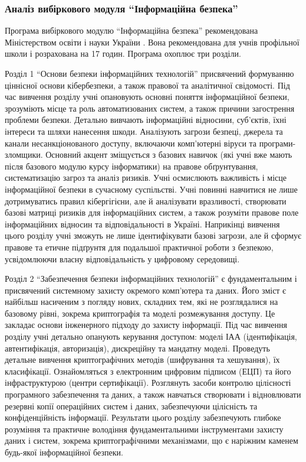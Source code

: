 \subsubsection{Аналіз вибіркового модуля ``Інформаційна безпека''} 
Програма вибіркового модулю ``Інформаційна безпека'' рекомендована Міністерством освіти і науки України \cite{inform_10_11_standart}. Вона рекомендована для учнів профільної школи і розрахована на 17 годин. Програма охоплює три розділи.

Розділ 1 ``Основи безпеки інформаційних технологій'' присвячений формуванню ціннісної основи кібербезпеки, а також правової та аналітичної свідомості. Під час вивчення розділу учні опановують основні поняття інформаційної безпеки, зрозуміють місце та роль автоматизованих систем, а також причини загострення проблеми безпеки. Детально вивчають інформаційні відносини, суб'єктів, їхні інтереси та шляхи нанесення шкоди. Аналізують загрози безпеці, джерела та канали несанкціонованого доступу, включаючи комп'ютерні віруси та програми-зломщики. Основний акцент зміщується з базових навичок (які учні вже мають після базового модулю курсу інформатики) на правове обґрунтування, систематизацію загроз та аналіз ризиків. Учні осмислюють важливість і місце інформаційної безпеки в сучасному суспільстві. Учні повинні навчитися не лише дотримуватись правил кібергігієни, але й аналізувати вразливості, створювати базові матриці ризиків для інформаційних систем, а також розуміти правове поле інформаційних відносин та відповідальності в Україні. 
Наприкінці вивчення цього розділу учні зможуть не лише ідентифікувати базові загрози, але й сформує правове та етичне підґрунтя для подальшої практичної роботи з безпекою, усвідомлюючи власну відповідальність у цифровому середовищі.

Розділ 2 ``Забезпечення безпеки інформаційних технологій'' є фундаментальним і присвячений системному захисту окремого комп'ютера та даних. Його зміст є найбільш насиченим з погляду нових, складних тем, які не розглядалися на базовому рівні, зокрема криптографія та моделі розмежування доступу. Це закладає основи інженерного підходу до захисту інформації. Під час вивчення розділу учні детально опанують керування доступом: моделі ІАА (ідентифікація, автентифікація, авторизація), дискреційну та мандатну моделі. Проведуть детальне вивчення криптографічних методів (шифрування та хешування), їх класифікації. Ознайомляться з електронним цифровим підписом (ЕЦП) та його інфраструктурою (центри сертифікації). Розглянуть засоби контролю цілісності програмного забезпечення та даних, а також навчаться створювати і відновлювати резервні копії операційних систем і даних, забезпечуючи цілісність та конфіденційність інформації. 
Результати цього розділу забезпечують глибоке розуміння та практичне володіння фундаментальними інструментами захисту даних і систем, зокрема криптографічними механізмами, що є наріжним каменем будь-якої інформаційної безпеки.

